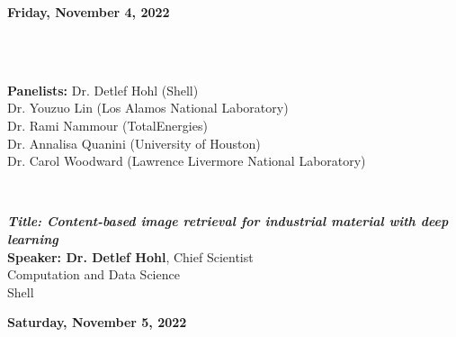 \begin{center}
\large \bf Friday, November 4, 2022
\end{center}


\\[-10pt]
\\[-6pt]
\hspace*{0.138\textwidth}\parbox{0.80\textwidth}{{{\bfseries Panelists:} Dr. Detlef Hohl (Shell)} \\
\hspace*{1.85cm}Dr. Youzuo Lin (Los Alamos National Laboratory)\\
\hspace*{1.85cm}Dr. Rami Nammour (TotalEnergies)\\
\hspace*{1.85cm}Dr. Annalisa Quanini (University of Houston)\\
\hspace*{1.85cm}Dr. Carol Woodward (Lawrence Livermore National Laboratory)
}\hspace{0.20\textwidth}\vspace{2ex}

\\[-6pt]
\hspace*{0.138\textwidth}\parbox{0.94\textwidth}{{\bfseries\itshape Title: Content-based image retrieval for industrial material with deep learning}\\
{\bf Speaker: Dr. Detlef Hohl}, Chief Scientist\\
\hspace*{1.7cm}Computation and Data Science\\
\hspace*{1.7cm}Shell
}\vspace{2ex}




\begin{center}
\large \bf Saturday, November 5, 2022
\end{center}

